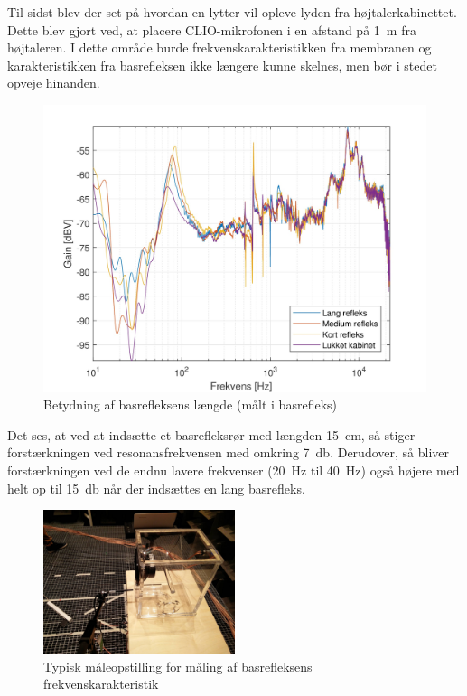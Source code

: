 \newpage
Til sidst blev der set på hvordan en lytter vil opleve lyden fra højtalerkabinettet. Dette blev gjort ved, at placere CLIO-mikrofonen i en afstand på \SI{1}{\meter} fra højtaleren. I dette område burde frekvenskarakteristikken fra membranen og karakteristikken fra basrefleksen ikke længere kunne skelnes, men bør i stedet opveje hinanden.
\begin{figure}[H]
	\centering
	\vspace{-12pt}
	\includegraphics[width=\textwidth]{Billeder/Grafer/BasrefleksLengthFar}
	\caption{Betydning af basrefleksens længde (målt i basrefleks)}
\end{figure}

Det ses, at ved at indsætte et basrefleksrør med længden \SI{15}{\centi\meter}, så stiger forstærkningen ved resonansfrekvensen med omkring \SI{7}{\decibel}. Derudover, så bliver forstærkningen ved de endnu lavere frekvenser (\SI{20}{\hertz} til \SI{40}{\hertz}) også højere med helt op til \SI{15}{\decibel} når der indsættes en lang basrefleks.
\begin{figure}[H]
	\centering
	\includegraphics[width=0.5\textwidth]{Billeder/MaalBasrefleks}
	\caption{Typisk måleopstilling for måling af basrefleksens frekvenskarakteristik}
\end{figure}